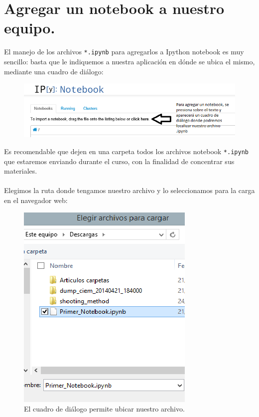 \documentclass[12pt]{article}
\begin{document}
\section{Agregar un notebook a nuestro equipo.}
El manejo de los archivos \texttt{*.ipynb} para agregarlos a Ipython notebook es muy sencillo: basta que le indiquemos a nuestra aplicación en dónde se ubica el mismo, mediante una cuadro de diálogo:
\begin{figure}[H]
	\centering
	\includegraphics[scale=0.6]{Imagenes/ipython_notebook_08.png} 
\end{figure}
Es recomendable que dejen en una carpeta todos los archivos notebook \texttt{*.ipynb} que estaremos enviando durante el curso, con la finalidad de concentrar sus materiales.
\\
\\
Elegimos la ruta donde tengamos nuestro archivo y lo seleccionamos para la carga en el navegador web:
\begin{figure}
	\centering
	\includegraphics[scale=0.6]{Imagenes/ipython_notebook_06.png}
	\caption{El cuadro de diálogo permite ubicar nuestro archivo.}
\end{figure}
\newpage
\end{document}
